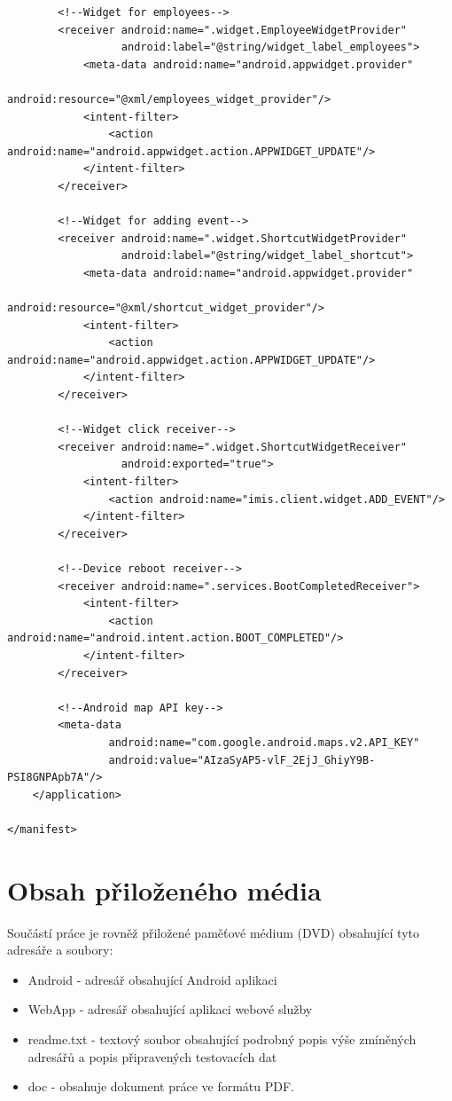 \documentclass{diplomka}
\begin{document}
\begin{lstlisting}
        <!--Widget for employees-->
        <receiver android:name=".widget.EmployeeWidgetProvider"
                  android:label="@string/widget_label_employees">
            <meta-data android:name="android.appwidget.provider"
                       android:resource="@xml/employees_widget_provider"/>
            <intent-filter>
                <action android:name="android.appwidget.action.APPWIDGET_UPDATE"/>
            </intent-filter>
        </receiver>

        <!--Widget for adding event-->
        <receiver android:name=".widget.ShortcutWidgetProvider"
                  android:label="@string/widget_label_shortcut">
            <meta-data android:name="android.appwidget.provider"
                       android:resource="@xml/shortcut_widget_provider"/>
            <intent-filter>
                <action android:name="android.appwidget.action.APPWIDGET_UPDATE"/>
            </intent-filter>
        </receiver>

        <!--Widget click receiver-->
        <receiver android:name=".widget.ShortcutWidgetReceiver"
                  android:exported="true">
            <intent-filter>
                <action android:name="imis.client.widget.ADD_EVENT"/>
            </intent-filter>
        </receiver>

        <!--Device reboot receiver-->
        <receiver android:name=".services.BootCompletedReceiver">
            <intent-filter>
                <action android:name="android.intent.action.BOOT_COMPLETED"/>
            </intent-filter>
        </receiver>

        <!--Android map API key-->
        <meta-data
                android:name="com.google.android.maps.v2.API_KEY"
                android:value="AIzaSyAP5-vlF_2EjJ_GhiyY9B-PSI8GNPApb7A"/>
    </application>

</manifest>
\end{lstlisting}

\chapter{Obsah přiloženého média}
Součástí práce je rovněž přiložené paměťové médium (DVD) obsahující tyto adresáře a soubory:
\begin{itemize}
\item Android - adresář obsahující Android aplikaci
\item WebApp - adresář obsahující aplikaci webové služby
\item readme.txt - textový soubor obsahující podrobný popis výše zmíněných adresářů a popis připravených testovacích dat
\item doc - obsahuje dokument práce ve formátu PDF.
\end{itemize}
\end{document}
